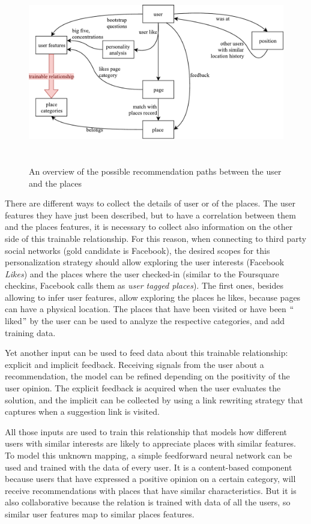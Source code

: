 \begin{figure}[!htb]
    \centering
    \includegraphics[max width=0.9\linewidth,max height=8cm,keepaspectratio]{figures/recommendationPaths}
    \caption{An overview of the possible recommendation paths between the user and the places}\label{fig:recommendationPaths}
\end{figure}

There are different ways to collect the details of user or of the places. The user features they have just been described, but to have a correlation between them and the places features, it is necessary to collect also information on the other side of this trainable relationship. For this reason, when connecting to third party social networks (gold candidate is Facebook), the desired scopes for this personalization strategy should allow exploring the user interests (Facebook \textit{Likes}) and the places where the user checked-in (similar to the Foursquare checkins, Facebook calls them as \textit{user tagged places}). The first ones, besides allowing to infer user features, allow exploring the places he likes, because pages can have a physical location. The places that have been visited or have been $``$liked$"$  by the user can be used to analyze the respective categories, and add training data.

Yet another input can be used to feed data about this trainable relationship: explicit and implicit feedback. Receiving signals from the user about a recommendation, the model can be refined depending on the positivity of the user opinion. The explicit feedback is acquired when the user evaluates the solution, and the implicit can be collected by using a link rewriting strategy that captures when a suggestion link is visited.

All those inputs are used to train this relationship that models how different users with similar interests are likely to appreciate places with similar features. To model this unknown mapping, a simple feedforward neural network can be used and trained with the data of every user. It is a content-based component because users that have expressed a positive opinion on a certain category, will receive recommendations with places that have similar characteristics. But it is also collaborative because the relation is trained with data of all the users, so similar user features map to similar places features.

